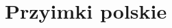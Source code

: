 \documentclass[a4paper, 12pt]{article}
\theoremstyle{remark}
\begin{document}
\section{Przyimki polskie} %
\label{sec:przyimki_polskie}

\end{document}
